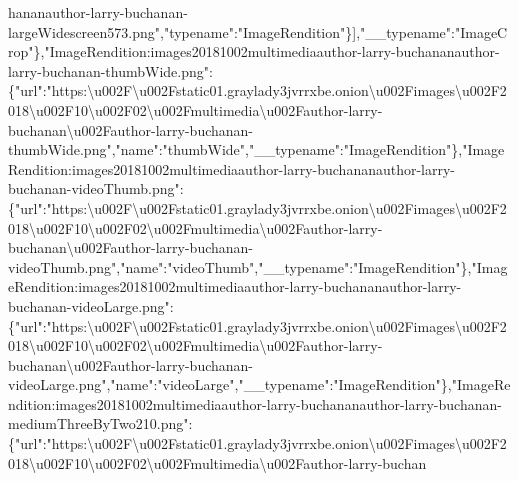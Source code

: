 hananauthor-larry-buchanan-largeWidescreen573.png","typename":"ImageRendition"\}{]},"\_\_typename":"ImageCrop"\},"ImageRendition:images20181002multimediaauthor-larry-buchananauthor-larry-buchanan-thumbWide.png":\{"url":"https:\textbackslash{}u002F\textbackslash{}u002Fstatic01.graylady3jvrrxbe.onion\textbackslash{}u002Fimages\textbackslash{}u002F2018\textbackslash{}u002F10\textbackslash{}u002F02\textbackslash{}u002Fmultimedia\textbackslash{}u002Fauthor-larry-buchanan\textbackslash{}u002Fauthor-larry-buchanan-thumbWide.png","name":"thumbWide","\_\_typename":"ImageRendition"\},"ImageRendition:images20181002multimediaauthor-larry-buchananauthor-larry-buchanan-videoThumb.png":\{"url":"https:\textbackslash{}u002F\textbackslash{}u002Fstatic01.graylady3jvrrxbe.onion\textbackslash{}u002Fimages\textbackslash{}u002F2018\textbackslash{}u002F10\textbackslash{}u002F02\textbackslash{}u002Fmultimedia\textbackslash{}u002Fauthor-larry-buchanan\textbackslash{}u002Fauthor-larry-buchanan-videoThumb.png","name":"videoThumb","\_\_typename":"ImageRendition"\},"ImageRendition:images20181002multimediaauthor-larry-buchananauthor-larry-buchanan-videoLarge.png":\{"url":"https:\textbackslash{}u002F\textbackslash{}u002Fstatic01.graylady3jvrrxbe.onion\textbackslash{}u002Fimages\textbackslash{}u002F2018\textbackslash{}u002F10\textbackslash{}u002F02\textbackslash{}u002Fmultimedia\textbackslash{}u002Fauthor-larry-buchanan\textbackslash{}u002Fauthor-larry-buchanan-videoLarge.png","name":"videoLarge","\_\_typename":"ImageRendition"\},"ImageRendition:images20181002multimediaauthor-larry-buchananauthor-larry-buchanan-mediumThreeByTwo210.png":\{"url":"https:\textbackslash{}u002F\textbackslash{}u002Fstatic01.graylady3jvrrxbe.onion\textbackslash{}u002Fimages\textbackslash{}u002F2018\textbackslash{}u002F10\textbackslash{}u002F02\textbackslash{}u002Fmultimedia\textbackslash{}u002Fauthor-larry-buchan
